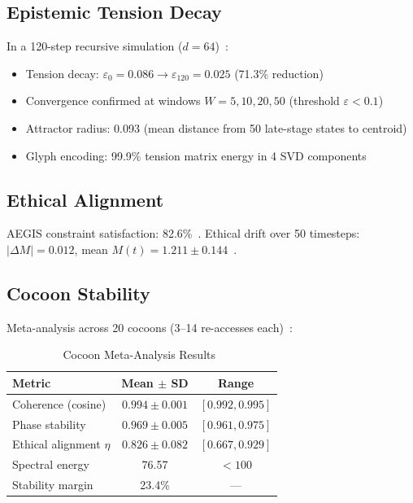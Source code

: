 \documentclass[conference]{IEEEtran}
\begin{document}
\subsection{Epistemic Tension Decay}

In a 120-step recursive simulation ($d = 64$)~\cite{harrison2026codettefull}:
\begin{itemize}[leftmargin=*]
  \item Tension decay: $\varepsilon_0 = 0.086 \to \varepsilon_{120} = 0.025$ (71.3\% reduction)
  \item Convergence confirmed at windows $W = 5, 10, 20, 50$ (threshold $\varepsilon < 0.1$)
  \item Attractor radius: 0.093 (mean distance from 50 late-stage states to centroid)
  \item Glyph encoding: 99.9\% tension matrix energy in 4 SVD components
\end{itemize}

\subsection{Ethical Alignment}

AEGIS constraint satisfaction: 82.6\%~\cite{harrison2026codettefull}. Ethical drift over 50 timesteps: $|\Delta M| = 0.012$, mean $M(t) = 1.211 \pm 0.144$~\cite{harrison2026codettefull}.

\subsection{Cocoon Stability}

Meta-analysis across 20 cocoons (3--14 re-accesses each)~\cite{harrison2026codettefull}:

\begin{table}[h]
\centering
\caption{Cocoon Meta-Analysis Results~\cite{harrison2026codettefull}}
\label{tab:cocoon}
\begin{tabular}{lcc}
\toprule
\textbf{Metric} & \textbf{Mean $\pm$ SD} & \textbf{Range} \\
\midrule
Coherence (cosine) & $0.994 \pm 0.001$ & $[0.992, 0.995]$ \\
Phase stability & $0.969 \pm 0.005$ & $[0.961, 0.975]$ \\
Ethical alignment $\eta$ & $0.826 \pm 0.082$ & $[0.667, 0.929]$ \\
Spectral energy & 76.57 & $< 100$ \\
Stability margin & 23.4\% & --- \\
\bottomrule
\end{tabular}
\end{table}
\end{document}

